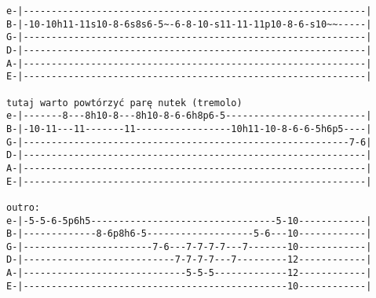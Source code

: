 \begin{verbatim}
e-|-------------------------------------------------------------|
B-|-10-10h11-11s10-8-6s8s6-5~-6-8-10-s11-11-11p10-8-6-s10~~-----|
G-|-------------------------------------------------------------|
D-|-------------------------------------------------------------|
A-|-------------------------------------------------------------|
E-|-------------------------------------------------------------|

tutaj warto powtórzyć parę nutek (tremolo)
e-|-------8---8h10-8---8h10-8-6-6h8p6-5-------------------------|
B-|-10-11---11-------11-----------------10h11-10-8-6-6-5h6p5----|
G-|----------------------------------------------------------7-6|
D-|-------------------------------------------------------------|
A-|-------------------------------------------------------------|
E-|-------------------------------------------------------------|

outro:
e-|-5-5-6-5p6h5---------------------------------5-10------------|
B-|-------------8-6p8h6-5-------------------5-6---10------------|
G-|-----------------------7-6---7-7-7-7---7-------10------------|
D-|---------------------------7-7-7-7---7---------12------------|
A-|-----------------------------5-5-5-------------12------------|
E-|-----------------------------------------------10------------|
\end{verbatim}
\newpage


